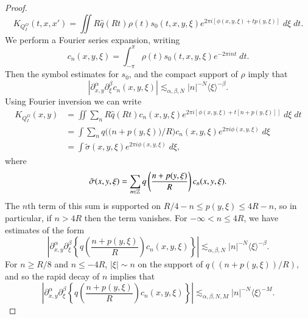 \begin{proof}
\begin{equation}
        K_{Q_I^{\Omega}}(t,x,x') = \iint R \widehat{q}(Rt) \rho(t) s_0(t,x,y,\xi) e^{2 \pi i [ \phi(x,y,\xi) + t p(y,\xi) ]}\; d\xi\; dt.
    \end{equation}
    We perform a Fourier series expansion, writing
    \begin{equation} c_n(x,y,\xi) = \int_{-\pi}^\pi \rho(t) s_0(t,x,y,\xi) e^{-2 \pi i n t}\; dt. \end{equation}
    Then the symbol estimates for $s_0$, and the compact support of $\rho$ imply that
    \begin{equation} |\partial_{x,y}^\alpha \partial_\xi^\beta c_n(x,y,\xi)| \lesssim_{\alpha,\beta,N} |n|^{-N} \langle \xi \rangle^{-\beta}. \end{equation}
    Using Fourier inversion we can write
    \begin{equation}
    \begin{split}
        K_{Q_I^\Omega}(x,y) &= \iint \sum\nolimits_n R \widehat{q}(Rt) c_n(x,y,\xi) e^{2 \pi i [ \phi(x,y,\xi) + t [ n + p(y,\xi) ] ]}\; d\xi\; dt\\
        &= \int \sum\nolimits_n q \Big( \big( n + p(y,\xi) \big) / R \Big) c_n(x,y,\xi) e^{2 \pi i \phi(x,y,\xi)}\; d\xi\\
        &= \int \tilde{\sigma}(x,y,\xi) e^{2 \pi i \phi(x,y,\xi)}\; d\xi, 
    \end{split}
    \end{equation}
    where
    \begin{equation} \tilde{\sigma}(x,y,\xi) = \sum_{n \in \operatorname{\mathbb{Z}}} q \left( \frac{n + p(y,\xi)}{R} \right) c_n(x,y,\xi). \end{equation}
    The $n$th term of this sum is supported on $R/4 - n \leq p(y,\xi) \leq 4R - n$, so in particular, if $n > 4R$ then the term vanishes. For $-\infty < n \leq 4R$, we have estimates of the form
    \begin{equation} \left| \partial_{x,y}^\alpha \partial_\xi^\beta \left\{ q \left( \frac{n + p(y,\xi)}{R} \right) c_n(x,y,\xi) \right\} \right| \lesssim_{\alpha,\beta,N} |n|^{-N} \langle \xi \rangle^{-\beta}. \end{equation}
    For $n \geq R/8$ and $n \leq -4R$, $|\xi| \sim n$ on the support of $q( (n + p(y,\xi)) / R )$, and so the rapid decay of $n$ implies that 
    \begin{equation} \left| \partial_{x,y}^\alpha \partial_\xi^\beta \left\{ q \left( \frac{n + p(y,\xi)}{R} \right) c_n(x,y,\xi) \right\} \right| \lesssim_{\alpha,\beta,N,M} |n|^{-N} \langle \xi \rangle^{-M}. \end{equation}

\end{proof}
